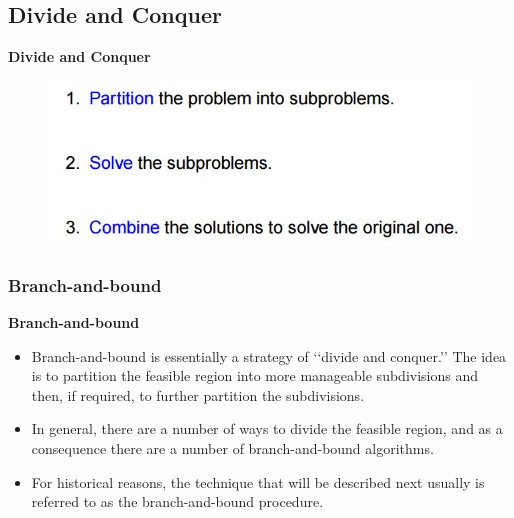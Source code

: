 \documentclass{beamer}
\begin{document}
\subsection{Divide and Conquer}
\begin{frame}
	\Large
	\noindent \textbf{Divide and Conquer}
	\begin{figure}
		\centering
		\includegraphics[width=0.9\linewidth]{divideandconquer}
		
	\end{figure}
	
\end{frame}
\begin{frame}
	\frametitle{Branch-and-bound}
\noindent \textbf{Branch-and-bound}
	\begin{itemize}
		\item Branch-and-bound is essentially a strategy of ‘‘divide and conquer.’’ The idea is to partition the feasible
		region into more manageable subdivisions and then, if required, to further partition the subdivisions. 
		\item In
		general, there are a number of ways to divide the feasible region, and as a consequence there are a number of
		branch-and-bound algorithms. 
		
		\item For historical reasons, the technique that will be described next usually is referred to as the
		branch-and-bound procedure.
		
	\end{itemize}
	
\end{frame}


\end{document}
